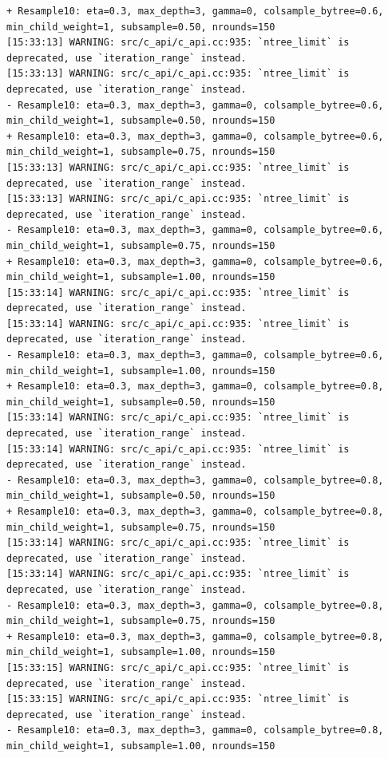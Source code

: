 \documentclass[
  letterpaper,
  DIV=11,
  numbers=noendperiod]{scrartcl}
\begin{document}
\begin{verbatim}
+ Resample10: eta=0.3, max_depth=3, gamma=0, colsample_bytree=0.6, min_child_weight=1, subsample=0.50, nrounds=150 
[15:33:13] WARNING: src/c_api/c_api.cc:935: `ntree_limit` is deprecated, use `iteration_range` instead.
[15:33:13] WARNING: src/c_api/c_api.cc:935: `ntree_limit` is deprecated, use `iteration_range` instead.
- Resample10: eta=0.3, max_depth=3, gamma=0, colsample_bytree=0.6, min_child_weight=1, subsample=0.50, nrounds=150 
+ Resample10: eta=0.3, max_depth=3, gamma=0, colsample_bytree=0.6, min_child_weight=1, subsample=0.75, nrounds=150 
[15:33:13] WARNING: src/c_api/c_api.cc:935: `ntree_limit` is deprecated, use `iteration_range` instead.
[15:33:13] WARNING: src/c_api/c_api.cc:935: `ntree_limit` is deprecated, use `iteration_range` instead.
- Resample10: eta=0.3, max_depth=3, gamma=0, colsample_bytree=0.6, min_child_weight=1, subsample=0.75, nrounds=150 
+ Resample10: eta=0.3, max_depth=3, gamma=0, colsample_bytree=0.6, min_child_weight=1, subsample=1.00, nrounds=150 
[15:33:14] WARNING: src/c_api/c_api.cc:935: `ntree_limit` is deprecated, use `iteration_range` instead.
[15:33:14] WARNING: src/c_api/c_api.cc:935: `ntree_limit` is deprecated, use `iteration_range` instead.
- Resample10: eta=0.3, max_depth=3, gamma=0, colsample_bytree=0.6, min_child_weight=1, subsample=1.00, nrounds=150 
+ Resample10: eta=0.3, max_depth=3, gamma=0, colsample_bytree=0.8, min_child_weight=1, subsample=0.50, nrounds=150 
[15:33:14] WARNING: src/c_api/c_api.cc:935: `ntree_limit` is deprecated, use `iteration_range` instead.
[15:33:14] WARNING: src/c_api/c_api.cc:935: `ntree_limit` is deprecated, use `iteration_range` instead.
- Resample10: eta=0.3, max_depth=3, gamma=0, colsample_bytree=0.8, min_child_weight=1, subsample=0.50, nrounds=150 
+ Resample10: eta=0.3, max_depth=3, gamma=0, colsample_bytree=0.8, min_child_weight=1, subsample=0.75, nrounds=150 
[15:33:14] WARNING: src/c_api/c_api.cc:935: `ntree_limit` is deprecated, use `iteration_range` instead.
[15:33:14] WARNING: src/c_api/c_api.cc:935: `ntree_limit` is deprecated, use `iteration_range` instead.
- Resample10: eta=0.3, max_depth=3, gamma=0, colsample_bytree=0.8, min_child_weight=1, subsample=0.75, nrounds=150 
+ Resample10: eta=0.3, max_depth=3, gamma=0, colsample_bytree=0.8, min_child_weight=1, subsample=1.00, nrounds=150 
[15:33:15] WARNING: src/c_api/c_api.cc:935: `ntree_limit` is deprecated, use `iteration_range` instead.
[15:33:15] WARNING: src/c_api/c_api.cc:935: `ntree_limit` is deprecated, use `iteration_range` instead.
- Resample10: eta=0.3, max_depth=3, gamma=0, colsample_bytree=0.8, min_child_weight=1, subsample=1.00, nrounds=150 

\end{verbatim}
\end{document}
